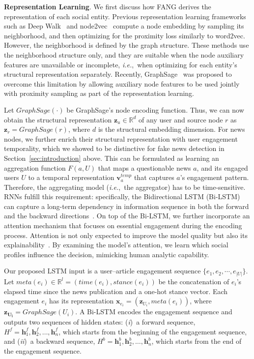 \documentclass[sigconf]{acmart}
\theoremstyle{definition}
\theoremstyle{hypothesis}
\begin{document}
\textbf{Representation Learning}. We first discuss how FANG derives the representation of each social entity. Previous representation learning frameworks such as Deep Walk~\cite{perozzi2014deepwalk} and node2vec~\cite{grover2016node2vec} compute a node embedding by sampling its neighborhood, and then optimizing for the proximity loss similarly to word2vec. However, the neighborhood is defined by the graph structure. These methods use the neighborhood structure only, and they are suitable when the node auxiliary features are unavailable or incomplete, \emph{i.e.},~when optimizing for each entity's structural representation separately. Recently, GraphSage~\cite{Hamilton2017InductiveRL} was proposed to overcome this limitation by allowing auxiliary node features to be used jointly with proximity sampling as part of the representation learning. 

Let $GraphSage(\cdot)$ be GraphSage's node encoding function. Thus, we can now obtain the structural representation $\boldsymbol{z}_u\in \mathbb{R}^d$ of any user and source node $r$ as $\boldsymbol{z}_r=GraphSage(r)$, where $d$ is the structural embedding dimension. For news nodes, we further enrich their structural representation with user engagement temporality, which we showed to be distinctive for fake news detection in Section~\ref{sec:introduction} above. This can be formulated as learning an aggregation function $F(a,U)$ that maps a questionable news $a$, and its engaged users $U$ to a temporal representation $\boldsymbol{v}^{temp}_{a}$ that captures $a$'s engagement pattern. Therefore, the aggregating model (\textit{i.e.},~the aggregator) has to be time-sensitive. 
RNNs fulfill this requirement: specifically, the Bidirectional LSTM (Bi-LSTM) can capture a long-term dependency in information sequence in both the forward and the backward directions~\cite{lstm1997hochreiter}. On top of the Bi-LSTM, we further incorporate an attention mechanism that focuses on essential engagement during the encoding process. Attention is not only expected to improve the model quality but also its explainability~\cite{luong2015effective,devlin2019bert}. By examining the model's attention, we learn which social profiles influence the decision, mimicking human analytic capability. 

Our proposed LSTM input is a user--article engagement sequence $\{e_1, e_2,\cdots,e_{|U|}\}$. Let $meta(e_i)\in \mathbb{R}^l=(time(e_i),stance(e_i))$ be the concatenation of $e_i$'s elapsed time since the news publication and a one-hot stance vector. Each engagement $e_i$ has its representation $\boldsymbol{x}_{e_i}= (\boldsymbol{z}_{U_i}, meta(e_i))$, where $\boldsymbol{z_{U_i}}=GraphSage(U_i)$. A Bi-LSTM encodes the engagement sequence and outputs two sequences of hidden states: (\emph{i})~a forward sequence,
$H^f={\boldsymbol{h}^f_1, \boldsymbol{h}^f_2,\ldots,
  \boldsymbol{h}^f_n}$, which starts from the beginning of the engagement sequence, and
(\emph{ii})~a backward sequence, $H^b={\boldsymbol{h}^b_1,
  \boldsymbol{h}^b_2,\ldots, \boldsymbol{h}^b_n}$, which starts from the
end of the engagement sequence. 
\end{document}

